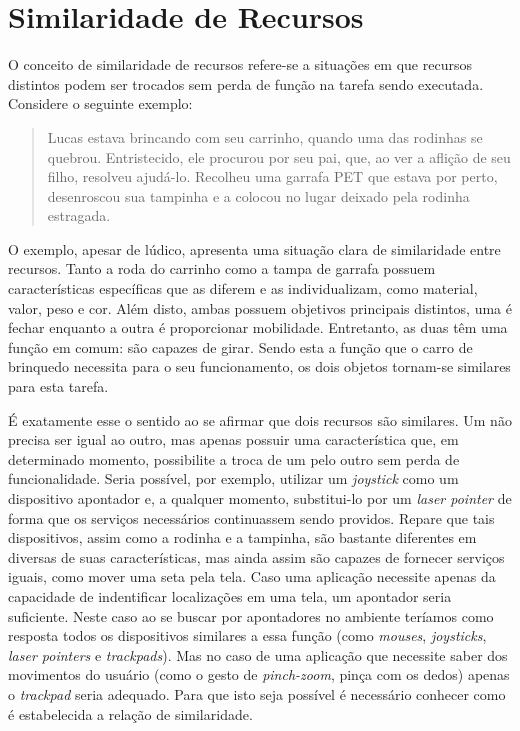 \section{Similaridade de Recursos}
\label{sec:equivalenciaRecursos}

O conceito de similaridade de recursos refere-se a situações em que recursos distintos podem ser trocados sem perda de função na tarefa sendo executada. Considere o seguinte exemplo:

\begin{quote}
	Lucas estava brincando com seu carrinho, quando uma das rodinhas se quebrou. Entristecido, ele procurou por seu pai, que, ao ver a aflição de seu filho, resolveu ajudá-lo. Recolheu uma garrafa PET que estava por perto, desenroscou sua tampinha e a colocou no lugar deixado pela rodinha estragada.
\end{quote}

O exemplo, apesar de lúdico, apresenta uma situação clara de similaridade entre recursos. Tanto a roda do carrinho como a tampa de garrafa possuem características específicas que as diferem e as individualizam, como material, valor, peso e cor. Além disto, ambas possuem objetivos principais distintos, uma é fechar enquanto a outra é proporcionar mobilidade. Entretanto, as duas têm uma função em comum: são capazes de girar. Sendo esta a função que o carro de brinquedo necessita para o seu funcionamento, os dois objetos tornam-se similares para esta tarefa.

É exatamente esse o sentido ao se afirmar que dois recursos são similares. Um não precisa ser igual ao outro, mas apenas possuir uma característica que, em determinado momento, possibilite a troca de um pelo outro sem perda de funcionalidade. Seria possível, por exemplo, utilizar um \emph{joystick} como um dispositivo apontador e, a qualquer momento, substitui-lo por um \emph{laser pointer} de forma que os serviços necessários continuassem sendo providos. Repare que tais dispositivos, assim como a rodinha e a tampinha, são bastante diferentes em diversas de suas características, mas ainda assim são capazes de fornecer serviços iguais, como mover uma seta pela tela. Caso uma aplicação necessite apenas da capacidade de indentificar localizações em uma tela, um apontador seria suficiente. Neste caso ao se buscar por apontadores no ambiente teríamos como resposta todos os dispositivos similares a essa função (como \emph{mouses}, \emph{joysticks}, \emph{laser pointers} e \emph{trackpads}). Mas no caso de uma aplicação que necessite saber dos movimentos do usuário (como o gesto de \emph{pinch-zoom}, pinça com os dedos) apenas o \emph{trackpad} seria adequado. Para que isto seja possível é necessário conhecer como é estabelecida a relação de similaridade.

